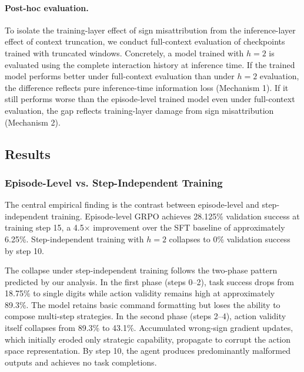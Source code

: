 \paragraph{Post-hoc evaluation.}
To isolate the training-layer effect of sign misattribution from the inference-layer effect of context truncation, we conduct full-context evaluation of checkpoints trained with truncated windows. Concretely, a model trained with $h = 2$ is evaluated using the complete interaction history at inference time. If the trained model performs better under full-context evaluation than under $h = 2$ evaluation, the difference reflects pure inference-time information loss (Mechanism 1). If it still performs worse than the episode-level trained model even under full-context evaluation, the gap reflects training-layer damage from sign misattribution (Mechanism 2).

\subsection{Results}
\label{sec:results}

\subsubsection{Episode-Level vs. Step-Independent Training}
\label{sec:results_main}

The central empirical finding is the contrast between episode-level and step-independent training. Episode-level GRPO achieves 28.125\% validation success at training step 15, a 4.5$\times$ improvement over the SFT baseline of approximately 6.25\%. Step-independent training with $h = 2$ collapses to 0\% validation success by step 10.



The collapse under step-independent training follows the two-phase pattern predicted by our analysis. In the first phase (steps 0--2), task success drops from 18.75\% to single digits while action validity remains high at approximately 89.3\%. The model retains basic command formatting but loses the ability to compose multi-step strategies. In the second phase (steps 2--4), action validity itself collapses from 89.3\% to 43.1\%. Accumulated wrong-sign gradient updates, which initially eroded only strategic capability, propagate to corrupt the action space representation. By step 10, the agent produces predominantly malformed outputs and achieves no task completions.

